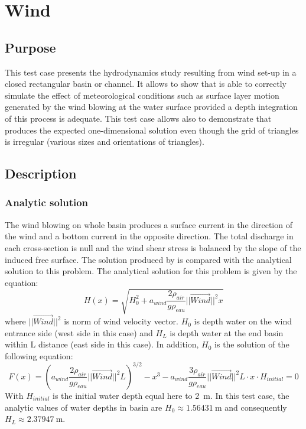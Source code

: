 \chapter{Wind}
%
\section{Purpose}

This test case presents the hydrodynamics study resulting from wind set-up in a 
closed rectangular basin or channel.
It allows to show that  is able to correctly simulate the effect 
of meteorological conditions such as surface layer motion generated by the wind blowing
at the water surface provided a depth integration of this process is adequate.
This test case allows also to demonstrate that  produces the expected
one-dimensional solution even though the grid of triangles is irregular 
(various sizes and orientations of triangles).

\section{Description}

\subsection{Analytic solution}

The wind blowing on whole basin produces a surface current in the direction of 
the wind and a bottom current in the opposite direction. The total discharge in each 
cross-section is null and the wind shear stress is balanced by the slope of the 
induced free surface. The solution produced by  is compared 
with the analytical solution to this problem. 
The analytical solution for this problem is given by the equation:
\begin{equation}
H(x)=\sqrt{H_0^2 +a_{wind}\frac{2\rho_{air}}{g\rho_{eau}}||\vec{Wind}||^{2} x}
\end{equation}
where $||\vec{Wind}||^{2}$ is norm of wind velocity vector. $H_0$ is 
depth water on the wind entrance side (west side in this case) 
and $H_L$ is depth water at the end basin within L distance (east side in this case).
In addition, $H_0$ is the solution of the following equation: 
\begin{equation}
F(x)=\left( a_{wind}\frac{2\rho_{air}}{g\rho_{eau}}||\vec{Wind}||^{2} 
L\right)^{3/2}-x^3-a_{wind}\frac{3\rho_{air}}{g\rho_{eau}}||\vec{Wind}||^{2}
L\cdot x\cdot H_{initial}=0
\end{equation}
With $H_{initial}$ is the initial water depth equal here to 2~m.
In this test case, the analytic values of water depths in basin are 
$H_0 \approx 1.56431~\text{m}$ and consequently $H_L \approx 2.37947~\text{m}$.


